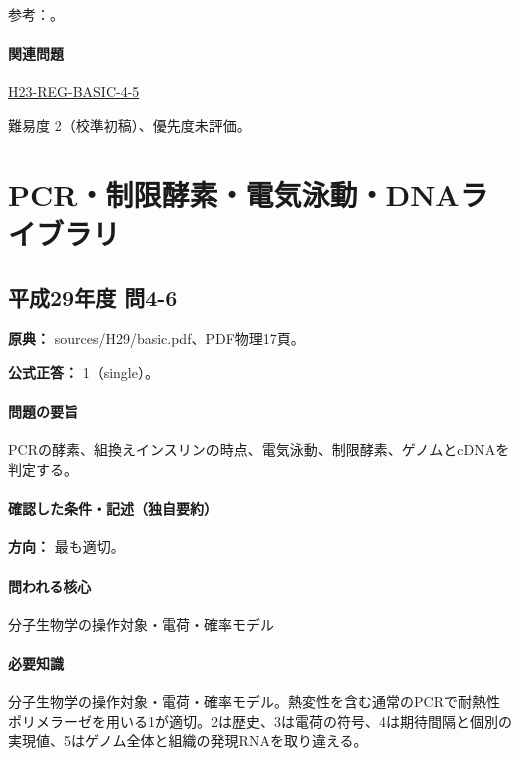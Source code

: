\par 参考：\cite{bio_membrane}。

\paragraph{関連問題} \hyperref[q:h23-reg-basic-4-5]{H23-REG-BASIC-4-5}

\par 難易度 2（校準初稿）、優先度未評価。

\section{PCR・制限酵素・電気泳動・DNAライブラリ}

\subsection{平成29年度 問4-6}
\label{q:h29-reg-basic-4-6}

\noindent\textbf{原典：} sources/H29/basic.pdf、PDF物理17頁。

\textbf{公式正答：} 1（single）。

\paragraph{問題の要旨} PCRの酵素、組換えインスリンの時点、電気泳動、制限酵素、ゲノムとcDNAを判定する。

\paragraph{確認した条件・記述（独自要約）}\mbox{}\par

\noindent\textbf{方向：} 最も適切。\par

\paragraph{問われる核心} 分子生物学の操作対象・電荷・確率モデル

\paragraph{必要知識} 分子生物学の操作対象・電荷・確率モデル。熱変性を含む通常のPCRで耐熱性ポリメラーゼを用いる1が適切。2は歴史、3は電荷の符号、4は期待間隔と個別の実現値、5はゲノム全体と組織の発現RNAを取り違える。

